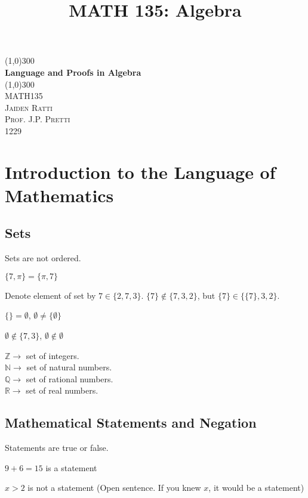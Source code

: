 \documentclass{article}
\title{MATH 135: Algebra}
\begin{document}
\begin{titlepage}
	\begin{center}
    \line(1,0){300}\\
    [0.65cm]
	\huge{\bfseries Language and Proofs in Algebra}\\
	\line(1,0){300}\\
	\textsc{\Large MATH135}\\
	\textsc{\Large  Jaiden Ratti}\\
        \textsc{\Large Prof. J.P. Pretti}\\
    \textsc{\Large 1229}\\
	[5.5cm]
	\end{center}
\end{titlepage}




\tableofcontents

\pagebreak

\section{Introduction to the Language of Mathematics}

\subsection{Sets}

Sets are not ordered. 

$\{7, \pi\} = \{\pi, 7\}$

Denote element of set by $7 \in \{2,7,3\}$. $\{7\} \notin \{7,3,2\}$, but $\{7\} \in \{\{7\},3,2\}$.

$\{\} = \emptyset$, $\emptyset \ne \{\emptyset\}$

$\emptyset \notin \{7,3\}$, $\emptyset \notin \emptyset$

$\mathbb{Z} \to$ set of integers.\\
$\mathbb{N} \to$ set of natural numbers.\\
$\mathbb{Q} \to$ set of rational numbers.\\
$\mathbb{R} \to$ set of real numbers.

\subsection{Mathematical Statements and Negation}

Statements are true or false. 

$9+6 =15$ is a statement

$x > 2$ is not a statement (Open sentence. If you knew $x$, it would be a statement)
\end{document}
